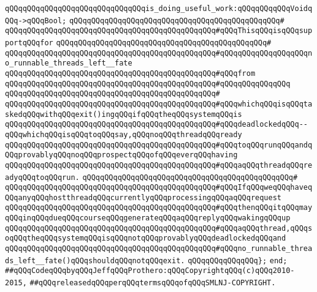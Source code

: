 \newline
\verb|qQQqqQQqqQQqqQQqqQQqqQQqqQQqqQQqis_doing_useful_work:qQQqqQQqqQQqVoidqQQq->qQQqBool;|\newline
\verb|qQQqqQQqqQQqqQQqqQQqqQQqqQQqqQQqqQQqqQQqqQQqqQQq#|\newline
\verb|qQQqqQQqqQQqqQQqqQQqqQQqqQQqqQQqqQQqqQQqqQQqqQQq#qQQqThisqQQqisqQQqsupportqQQqfor|\newline
\verb|qQQqqQQqqQQqqQQqqQQqqQQqqQQqqQQqqQQqqQQqqQQqqQQq#|\newline
\verb|qQQqqQQqqQQqqQQqqQQqqQQqqQQqqQQqqQQqqQQqqQQqqQQq#qQQqqQQqqQQqqQQqqQQqno_runnable_threads_left__fate|\newline
\verb|qQQqqQQqqQQqqQQqqQQqqQQqqQQqqQQqqQQqqQQqqQQqqQQq#qQQqfrom|\newline
\verb|qQQqqQQqqQQqqQQqqQQqqQQqqQQqqQQqqQQqqQQqqQQqqQQq#qQQqqQQqqQQqqQQq|\newline
\verb|qQQqqQQqqQQqqQQqqQQqqQQqqQQqqQQqqQQqqQQqqQQqqQQq#|\newline
\verb|qQQqqQQqqQQqqQQqqQQqqQQqqQQqqQQqqQQqqQQqqQQqqQQq#qQQqwhichqQQqisqQQqtaskedqQQqwithqQQqexit()ingqQQqifqQQqtheqQQqsystemqQQqis|\newline
\verb|qQQqqQQqqQQqqQQqqQQqqQQqqQQqqQQqqQQqqQQqqQQqqQQq#qQQqdeadlockedqQQq--qQQqwhichqQQqisqQQqtoqQQqsay,qQQqnoqQQqthreadqQQqready|\newline
\verb|qQQqqQQqqQQqqQQqqQQqqQQqqQQqqQQqqQQqqQQqqQQqqQQq#qQQqtoqQQqrunqQQqandqQQqprovablyqQQqnoqQQqprospectqQQqofqQQqeverqQQqhaving|\newline
\verb|qQQqqQQqqQQqqQQqqQQqqQQqqQQqqQQqqQQqqQQqqQQqqQQq#qQQqaqQQqthreadqQQqreadyqQQqtoqQQqrun.|\newline
\verb|qQQqqQQqqQQqqQQqqQQqqQQqqQQqqQQqqQQqqQQqqQQqqQQq#|\newline
\verb|qQQqqQQqqQQqqQQqqQQqqQQqqQQqqQQqqQQqqQQqqQQqqQQq#qQQqIfqQQqweqQQqhaveqQQqanyqQQqhostthreadqQQqcurrentlyqQQqprocessingqQQqaqQQqrequest|\newline
\verb|qQQqqQQqqQQqqQQqqQQqqQQqqQQqqQQqqQQqqQQqqQQqqQQq#qQQqthenqQQqitqQQqmayqQQqinqQQqdueqQQqcourseqQQqgenerateqQQqaqQQqreplyqQQqwakingqQQqup|\newline
\verb|qQQqqQQqqQQqqQQqqQQqqQQqqQQqqQQqqQQqqQQqqQQqqQQq#qQQqaqQQqthread,qQQqsoqQQqtheqQQqsystemqQQqisqQQqnotqQQqprovablyqQQqdeadlockedqQQqand|\newline
\verb|qQQqqQQqqQQqqQQqqQQqqQQqqQQqqQQqqQQqqQQqqQQqqQQq#qQQqno_runnable_threads_left__fate()qQQqshouldqQQqnotqQQqexit.|\newline
\verb|qQQqqQQqqQQqqQQq};|\newline
\verb|end;|\newline
\newline
\verb|##qQQqCodeqQQqbyqQQqJeffqQQqProthero:qQQqCopyrightqQQq(c)qQQq2010-2015,|\newline
\verb|##qQQqreleasedqQQqperqQQqtermsqQQqofqQQqSMLNJ-COPYRIGHT.|\newline

